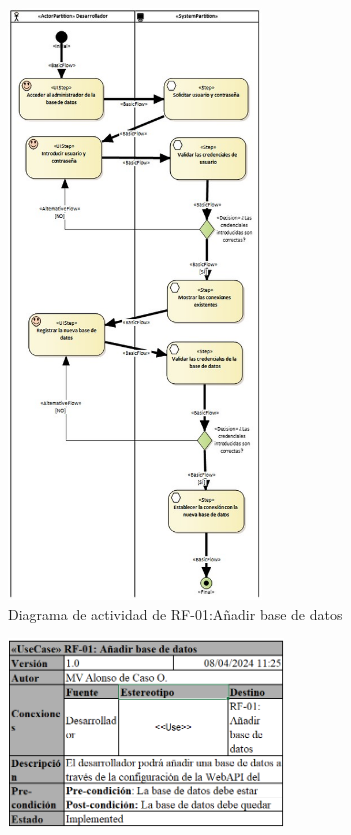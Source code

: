 \begin{figure}[H]
    \centering
    \includegraphics[width=0.60\textwidth]{figures/FR01.jpg}
    \caption{Diagrama de actividad de RF-01:Añadir base de datos}
    \label{fig:FR01}
\end{figure}

\begin{figure}[H]
    \centering
    \includegraphics[width=0.65\textwidth]{tables/RF01tab.png}
    \label{table:RF01tab}
\end{figure}

